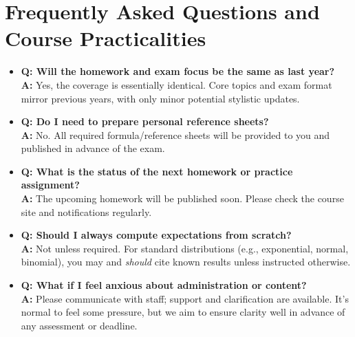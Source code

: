 \documentclass[12pt]{article}
\begin{document}
\section{Frequently Asked Questions and Course Practicalities}

\begin{tcolorbox}[title=Administrative FAQ and Advice, colback=gray!15!white]
    \begin{itemize}[leftmargin=2em]
        \item {\bf Q: Will the homework and exam focus be the same as last year?}\\
            \textbf{A:} Yes, the coverage is essentially identical. Core topics and exam format mirror previous years, with only minor potential stylistic updates.
        \item {\bf Q: Do I need to prepare personal reference sheets?}\\
            \textbf{A:} No. All required formula/reference sheets will be provided to you and published in advance of the exam.
        \item {\bf Q: What is the status of the next homework or practice assignment?}\\
            \textbf{A:} The upcoming homework will be published soon. Please check the course site and notifications regularly.
        \item {\bf Q: Should I always compute expectations from scratch?}\\
            \textbf{A:} Not unless required. For standard distributions (e.g., exponential, normal, binomial), you may and \emph{should} cite known results unless instructed otherwise.
        \item {\bf Q: What if I feel anxious about administration or content?}\\
            \textbf{A:} Please communicate with staff; support and clarification are available. It's normal to feel some pressure, but we aim to ensure clarity well in advance of any assessment or deadline.
    \end{itemize}
\end{tcolorbox}

\end{document}
